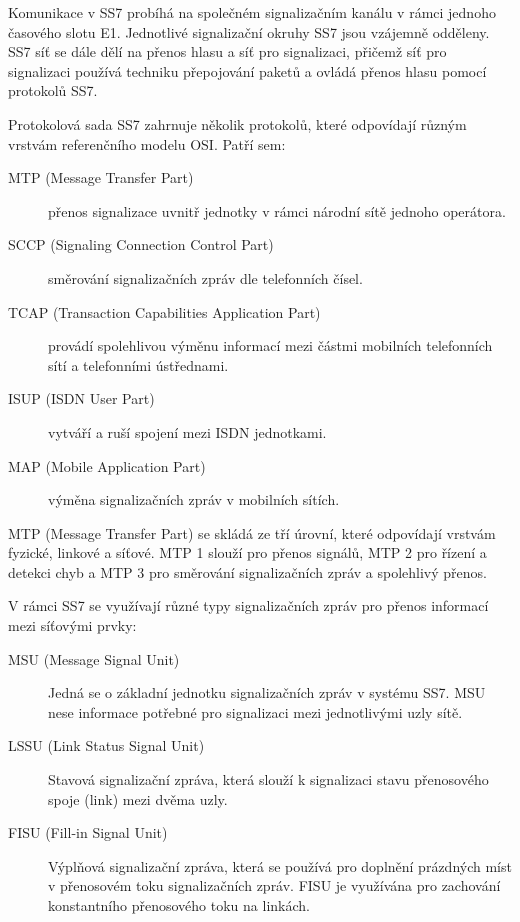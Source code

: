 Komunikace v SS7 probíhá na společném signalizačním kanálu v rámci jednoho časového slotu E1. Jednotlivé signalizační okruhy SS7 jsou vzájemně odděleny. SS7 síť se dále dělí na přenos hlasu a síť pro signalizaci, přičemž síť pro signalizaci používá techniku přepojování paketů a ovládá přenos hlasu pomocí protokolů SS7.

Protokolová sada SS7 zahrnuje několik protokolů, které odpovídají různým vrstvám referenčního modelu OSI. Patří sem:
\begin{description}
    \item[MTP (Message Transfer Part)] přenos signalizace uvnitř jednotky v rámci národní sítě jednoho operátora.
    \item[SCCP (Signaling Connection Control Part)] směrování signalizačních zpráv dle telefonních čísel.
    \item[TCAP (Transaction Capabilities Application Part)] provádí spolehlivou výměnu informací mezi částmi mobilních telefonních sítí a telefonními ústřednami.
    \item[ISUP (ISDN User Part)] vytváří a ruší spojení mezi ISDN jednotkami.
    \item[MAP (Mobile Application Part)] výměna signalizačních zpráv v mobilních sítích.
\end{description}

MTP (Message Transfer Part) se skládá ze tří úrovní, které odpovídají vrstvám fyzické, linkové a síťové. MTP 1 slouží pro přenos signálů, MTP 2 pro řízení a detekci chyb a MTP 3 pro směrování signalizačních zpráv a spolehlivý přenos.


V rámci SS7 se využívají různé typy signalizačních zpráv pro přenos informací mezi síťovými prvky:
\begin{description}
    \item[MSU (Message Signal Unit)] Jedná se o základní jednotku signalizačních zpráv v systému SS7. MSU nese informace potřebné pro signalizaci mezi jednotlivými uzly sítě.
    \item[LSSU (Link Status Signal Unit)] Stavová signalizační zpráva, která slouží k signalizaci stavu přenosového spoje (link) mezi dvěma uzly.
    \item[FISU (Fill-in Signal Unit)] Výplňová signalizační zpráva, která se používá pro doplnění prázdných míst v přenosovém toku signalizačních zpráv. FISU je využívána pro zachování konstantního přenosového toku na linkách.
\end{description}

